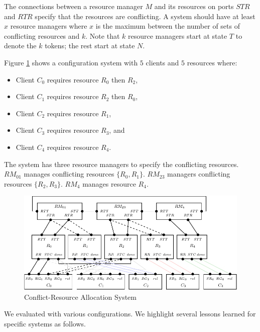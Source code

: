 The connections between a resource manager $M$ and its resources on ports $STR$ and $RTR$ specify that the 
resources are conflicting. 
A system should have at least $x$ resource managers where $x$ is the maximum between the number of sets of conflicting resources 
and $k$.
Note that $k$ resource managers start at state $T$ to denote the $k$ tokens; the rest start at state $N$. 

Figure \ref{fig:resourceallocation} shows a configuration system with $5$ clients and $5$ resources where:
\begin{itemize}
  \item Client $C_0$ requires resource $R_0$ then $R_2$,
  \item Client $C_1$ requires resource $R_2$ then $R_0$,
  \item Client $C_2$ requires resource $R_1$,
  \item Client $C_3$ requires resource $R_3$, and
  \item Client $C_4$ requires resource $R_4$.
\end{itemize}

The system has three resource managers to specify the conflicting resources. 
$RM_{01}$ manages conflicting resources $\{R_0,R_1\}$. 
$RM_{23}$ managers conflicting resources $\{R_2,R_3\}$.
$RM_{4}$ manages resource $R_4$. 

\begin{figure}[H]
\begin{center}
\includegraphics[scale=0.9]{compiledfigures/resourceallocation-crop.pdf}
\caption{Conflict-Resource Allocation System}
\label{fig:resourceallocation}
\end{center}
\end{figure}

We evaluated \deadlocktool{} with various configurations.
We highlight several lessons learned for specific systems as follows. 

